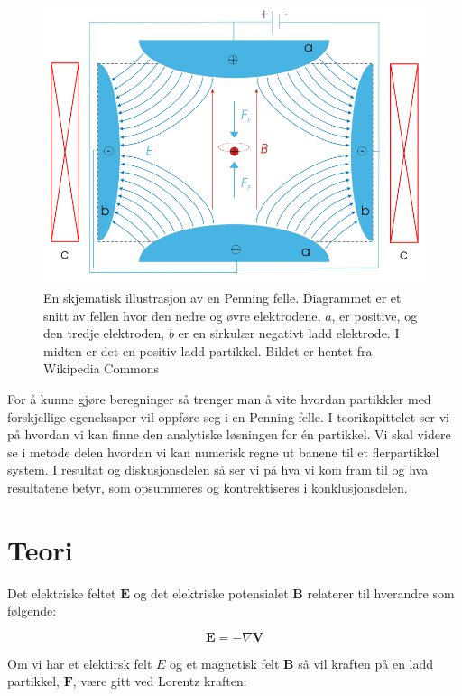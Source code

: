 \documentclass[reprint,english,notitlepage, nofootinbib]{revtex4-1}  %
\begin{document}
\begin{figure}
\centering
\includegraphics[scale=0.27]{penning.png}
\caption{En skjematisk illustrasjon av en Penning felle. Diagrammet er et snitt av fellen hvor den nedre og øvre elektrodene, $a$, er positive, og den tredje elektroden, $b$ er en sirkulær negativt ladd elektrode. I midten er det en positiv ladd partikkel. Bildet er hentet fra Wikipedia Commons}
\label{fig:Pen}
\end{figure}

For å kunne gjøre beregninger så trenger man å vite hvordan partikkler med forskjellige egeneksaper vil oppføre seg i en Penning felle. I teorikapittelet ser vi på hvordan vi kan finne den analytiske løsningen for én partikkel. Vi skal videre se i metode delen hvordan vi kan numerisk regne ut banene til et flerpartikkel system. I resultat og diskusjonsdelen så ser vi på hva vi kom fram til og hva resultatene betyr, som opsummeres og kontrektiseres i konklusjonsdelen.

\section{Teori}   %
Det elektriske feltet $\mathbf{E}$ og det elektriske potensialet $\mathbf{B}$ relaterer til hverandre som følgende:

\begin{equation}\label{E}
\mathbf{E} = - \nabla{\mathbf{V}}
\end{equation}

Om vi har et elektirsk felt $E$ og et magnetisk felt $\mathbf{B}$ så vil kraften på en ladd partikkel, $\mathbf{F}$, være gitt ved Lorentz kraften:
\end{document}
